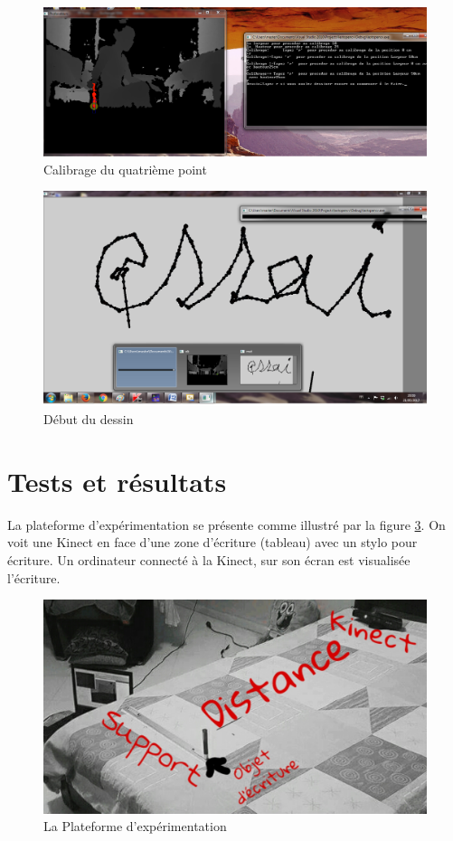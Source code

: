 \documentclass[12pt,a4paper,oneside]{book}
\begin{document}
	\begin{figure}[H]
		\centering
		\includegraphics[scale=0.47]{it7.png}
		\caption{Calibrage du quatrième point}
		\label{fig17}
		
	\end{figure}
	
	
	\begin{figure}[H]
		\centering
		\includegraphics[scale=0.47]{it5.png}
		\caption{Début du dessin}
		\label{fig12}
		
	\end{figure}
	
	
	\section{Tests et résultats}
	
	La plateforme d'expérimentation se présente comme illustré par la figure \ref{fig15}. On voit une Kinect en face d'une zone d'écriture (tableau) avec un stylo pour écriture. Un ordinateur connecté à la Kinect, sur son écran est visualisée l'écriture.
	
	
	\begin{figure}[H]	
		\centering
		\includegraphics[scale=0.35]{exp.jpg}
		\caption{La Plateforme d'expérimentation}
		\label{fig15}
	\end{figure}
	
\end{document}
